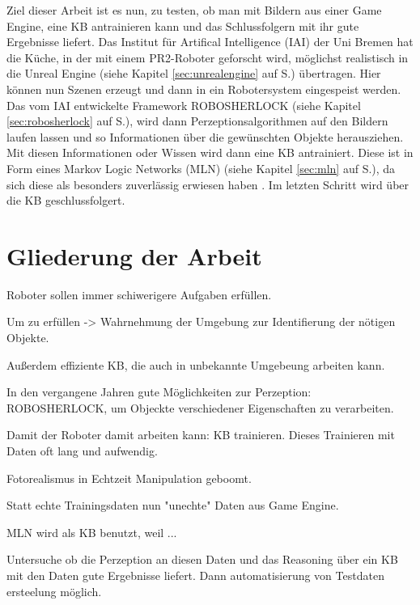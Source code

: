 Ziel dieser Arbeit ist es nun, zu testen, ob man mit Bildern aus einer Game Engine, eine KB antrainieren kann und das Schlussfolgern mit ihr gute Ergebnisse liefert. Das Institut für Artifical Intelligence (IAI) der Uni Bremen hat die Küche, in der mit einem PR2-Roboter geforscht wird, möglichst realistisch in die Unreal Engine (siehe Kapitel \ref{sec:unrealengine} auf S.\pageref{sec:unrealengine}) übertragen. Hier können nun Szenen erzeugt und dann in ein Robotersystem eingespeist werden. Das vom IAI entwickelte Framework ROBOSHERLOCK (siehe Kapitel \ref{sec:robosherlock} auf S.\pageref{sec:robosherlock}), wird dann Perzeptionsalgorithmen auf den Bildern laufen lassen und so Informationen über die gewünschten Objekte herausziehen. Mit diesen Informationen oder Wissen wird dann eine KB antrainiert. Diese ist in Form eines Markov Logic Networks (MLN) (siehe Kapitel \ref{sec:mln} auf S.\pageref{sec:mln}), da sich diese als besonders zuverlässig erwiesen haben . Im letzten Schritt wird über die KB geschlussfolgert.
     


\section{Gliederung der Arbeit}
\label{sec:gliederung}



Roboter sollen immer schiwerigere Aufgaben erfüllen.

Um zu erfüllen -> Wahrnehmung der Umgebung zur Identifierung der nötigen Objekte.

Außerdem effiziente KB, die auch in unbekannte Umgebeung arbeiten kann. \par

In den vergangene Jahren gute Möglichkeiten zur Perzeption: ROBOSHERLOCK, um Objeckte verschiedener Eigenschaften zu verarbeiten.

Damit der Roboter damit arbeiten kann: KB trainieren.
Dieses Trainieren mit Daten oft lang und aufwendig.

Fotorealismus in Echtzeit Manipulation geboomt.

Statt echte Trainingsdaten nun "unechte" Daten aus Game Engine.

MLN wird als KB benutzt, weil ...

Untersuche ob die Perzeption an diesen Daten und das Reasoning über ein KB mit den Daten gute Ergebnisse liefert. Dann automatisierung von Testdaten ersteelung möglich. 
   

